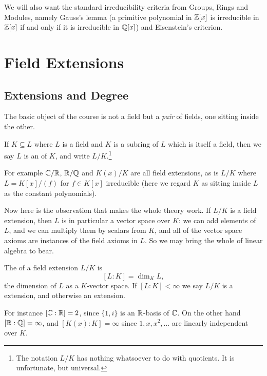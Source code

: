 \documentclass[a4paper]{scrartcl}
\begin{document}
We will also want the standard irreducibility criteria from Groups, Rings and Modules, namely Gauss's lemma (a primitive polynomial in $\mathbb{Z}[x]$ is irreducible in $\mathbb{Z}[x]$ if and only if it is irreducible in $\mathbb{Q}[x]$) and Eisenstein's criterion.

\section{Field Extensions}

\subsection{Extensions and Degree}

The basic object of the course is not a field but a \emph{pair} of fields, one sitting inside the other.

\begin{definition}
	If $K \subseteq L$ where $L$ is a field and $K$ is a subring of $L$ which is itself a field, then we say $L$ is an  of $K$, and write $L/K$.\footnote{The notation $L/K$ has nothing whatsoever to do with quotients. It is unfortunate, but universal.}
\end{definition}

For example $\mathbb{C}/\mathbb{R}$, $\mathbb{R}/\mathbb{Q}$ and $K(x)/K$ are all field extensions, as is $L/K$ where $L = K[x]/(f)$ for $f \in K[x]$ irreducible (here we regard $K$ as sitting inside $L$ as the constant polynomials).

Now here is the observation that makes the whole theory work. If $L/K$ is a field extension, then $L$ is in particular a vector space over $K$: we can add elements of $L$, and we can multiply them by scalars from $K$, and all of the vector space axioms are instances of the field axioms in $L$. So we may bring the whole of linear algebra to bear.

\begin{definition}[Degree]
	The  of a field extension $L/K$ is
	$$[L : K] = \dim_K L,$$
	the dimension of $L$ as a $K$-vector space. If $[L:K] < \infty$ we say $L/K$ is a  extension, and otherwise an  extension.
\end{definition}

For instance $[\mathbb{C} : \mathbb{R}] = 2$, since $\{1, i\}$ is an $\mathbb{R}$-basis of $\mathbb{C}$. On the other hand $[\mathbb{R} : \mathbb{Q}] = \infty$, and $[K(x) : K] = \infty$ since $1, x, x^2, \dots$ are linearly independent over $K$.
\end{document}
